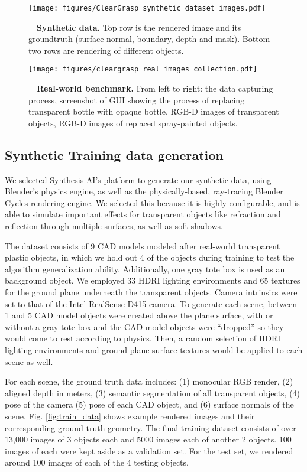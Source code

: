\documentclass[letterpaper, 10 pt, conference]{ieeeconf}
\begin{document}
\begin{figure}[ht]
    \centering
    \texttt{[image: figures/ClearGrasp\_synthetic\_dataset\_images.pdf]}
    \caption{ \label{fig:train_data}　\textbf{Synthetic data.} Top row is the rendered image and its groundtruth (surface normal, boundary, depth and mask). Bottom two rows are rendering of different objects.}
    \vspace{1mm}
    
    \centering
    \texttt{[image: figures/cleargrasp\_real\_images\_collection.pdf]}
    \caption{\label{fig:real_data}　\textbf{Real-world benchmark.} From left to right: the data capturing process, screenshot of GUI showing the process of replacing transparent bottle with opaque bottle, RGB-D images of transparent objects, RGB-D images of replaced spray-painted objects.
    }
    \vspace{-4mm}
\end{figure}


\subsection{Synthetic Training data generation}
\label{sec:data-syn}
We selected Synthesis AI's platform to generate our synthetic data, using Blender's physics engine\cite{blender}, as well as the physically-based, ray-tracing Blender Cycles \cite{Blendercycles} rendering engine.  We selected this because it is highly configurable, and is able to simulate important effects for transparent objects like refraction and reflection through multiple surfaces, as well as soft shadows.

The dataset consists of 9 CAD models modeled after real-world transparent plastic objects, in which we hold out 4 of the objects during training to test the algorithm generalization ability. Additionally, one gray tote box is used as an background object. We employed 33 HDRI lighting environments and 65 textures for the ground plane underneath the transparent objects.  
Camera intrinsics were set to that of the Intel RealSense D415 camera.  
To generate each scene, between 1 and 5 CAD model objects were created above the plane surface, with or without a gray tote box and the CAD model objects were “dropped” so they would come to rest according to physics. Then, a random selection of HDRI lighting environments and ground plane surface textures would be applied to each scene as well.  

For each scene, the ground truth data includes: (1) monocular RGB render, (2) aligned depth in meters, (3) semantic segmentation of all transparent objects, (4) pose of the camera (5) pose of each CAD object, and (6) surface normals of the scene.
Fig. \ref{fig:train_data} shows example rendered images and their corresponding ground truth geometry.
The final training dataset consists of over 13,000 images of 3 objects each and 5000 images each of another 2 objects. 100 images of each were kept aside as a validation set. For the test set, we rendered around 100 images of each of the 4 testing objects. 
\end{document}
